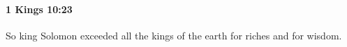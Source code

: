 
		\paragraph{1 Kings 10:23} %
			\label{1KINGS-10-23}

			So king Solomon exceeded all the kings of the earth for riches and for wisdom.


